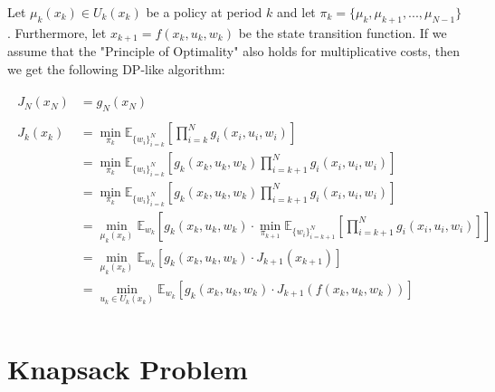 \documentclass[11pt, oneside]{article}   	%
\begin{document}
Let $\mu_k(x_k) \in U_k(x_k)$ be a policy at period $k$ and let $\pi_k = \{\mu_k, \mu_{k+1},...,\mu_{N-1}\}$. Furthermore, let $x_{k+1}=f(x_k,u_k,w_k)$ be the state transition function. If we assume that the "Principle of Optimality" also holds for multiplicative costs, then we get the following DP-like algorithm:

\begin{align}
\begin{split}
J_{N}(x_{N}) &= g_N(x_N)\\
\\
J_k(x_k) &= \min_{\pi_k} \mathbb{E}_{\{w_i\}_{i=k}^N}\left[\prod_{i=k}^N g_i(x_i, u_i, w_i)\right]\\
&= \min_{\pi_k} \mathbb{E}_{\{w_i\}_{i=k}^N}\left[g_k(x_k, u_k, w_k) \prod_{i=k+1}^N g_i(x_i, u_i, w_i)\right]\\
&= \min_{\pi_k} \mathbb{E}_{\{w_i\}_{i=k}^N}\left[g_k(x_k, u_k, w_k) \prod_{i=k+1}^N g_i(x_i, u_i, w_i)\right]\\
&= \min_{\mu_k(x_k)} \mathbb{E}_{w_k}\left[g_k(x_k, u_k, w_k) \cdot \min_{\pi_{k+1}} \mathbb{E}_{\{w_i\}_{i=k+1}^N}\left[\prod_{i=k+1}^N g_i(x_i, u_i, w_i)\right]\right]\\
&= \min_{\mu_k(x_k)} \mathbb{E}_{w_k}\left[g_k(x_k, u_k, w_k) \cdot J_{k+1}(x_{k+1})\right]\\
&= \min_{u_k \in U_k(x_k)} \mathbb{E}_{w_k}\left[g_k(x_k, u_k, w_k) \cdot J_{k+1}(f(x_k,u_k,w_k))\right]\\
\end{split}
\end{align}

\section{Knapsack Problem}
\end{document}
